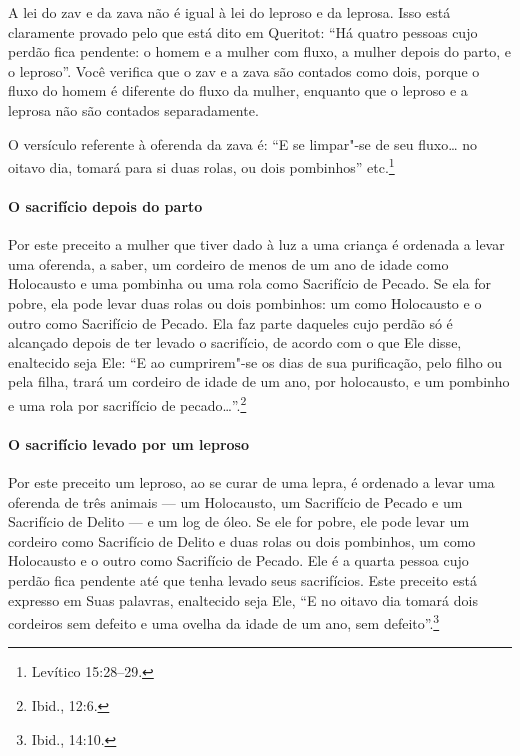 \begin{multicols}{2}
A lei do zav\starr{} e da zava\starr{} não é igual à lei do leproso e da
leprosa. Isso está claramente provado pelo que está dito em Queritot\starr:
``Há quatro pessoas cujo perdão fica pendente: o homem e a mulher com
fluxo, a mulher depois do parto, e o leproso''. Você verifica que o
zav\starr{} e a zava\starr{} são contados como dois, porque o fluxo do homem é
diferente do fluxo da mulher, enquanto que o leproso e a leprosa não
são contados separadamente.

O versículo referente à oferenda da zava\starr{} é: ``E se limpar"-se de seu
fluxo\ldots{} no oitavo dia, tomará para si duas rolas, ou dois pombinhos''
etc.\footnote{Levítico 15:28--29.}

\paragraph{O sacrifício depois do parto}

Por este preceito a mulher que tiver dado à luz a uma criança é
ordenada a levar uma oferenda, a saber, um cordeiro de menos de um ano
de idade como Holocausto e uma pombinha ou uma rola como Sacrifício de
Pecado. Se ela for pobre, ela pode levar duas rolas ou dois pombinhos:
um como Holocausto e o outro como Sacrifício de Pecado. Ela faz parte
daqueles cujo perdão só é alcançado depois de ter levado o sacrifício,
de acordo com o que Ele disse, enaltecido seja Ele: ``E ao cumprirem"-se
os dias de sua purificação, pelo filho ou pela filha, trará um cordeiro
de idade de um ano, por holocausto, e um pombinho e uma rola por
sacrifício de pecado\ldots{}''.\footnote{Ibid., 12:6.}

\paragraph{O sacrifício levado por um leproso}

Por este preceito um leproso, ao se curar de uma lepra, é ordenado a
levar uma oferenda de três animais --- um Holocausto, um Sacrifício de
Pecado e um Sacrifício de Delito --- e um log\starr{}
de óleo. Se ele for pobre, ele pode levar um cordeiro como Sacrifício de
Delito e duas rolas ou dois pombinhos, um como Holocausto e o outro como
Sacrifício de Pecado. Ele é a quarta pessoa cujo perdão fica pendente
até que tenha levado seus sacrifícios. Este preceito está expresso em
Suas palavras, enaltecido seja Ele, ``E no oitavo dia tomará dois
cordeiros sem defeito e uma ovelha da idade de um ano, sem defeito''.\footnote{Ibid., 14:10.}


\end{multicols}
